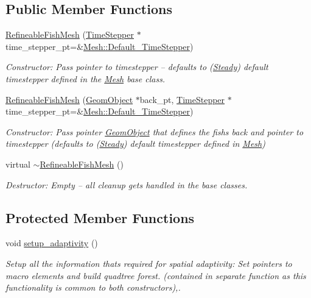 \subsection*{Public Member Functions}
\begin{DoxyCompactItemize}
\item 
\hyperlink{classoomph_1_1RefineableFishMesh_a7f31e65306286e83a5d17459bae9163d}{Refineable\+Fish\+Mesh} (\hyperlink{classoomph_1_1TimeStepper}{Time\+Stepper} $\ast$time\+\_\+stepper\+\_\+pt=\&\hyperlink{classoomph_1_1Mesh_a12243d0fee2b1fcee729ee5a4777ea10}{Mesh\+::\+Default\+\_\+\+Time\+Stepper})
\begin{DoxyCompactList}\small\item\em Constructor\+: Pass pointer to timestepper -- defaults to (\hyperlink{classoomph_1_1Steady}{Steady}) default timestepper defined in the \hyperlink{classoomph_1_1Mesh}{Mesh} base class. \end{DoxyCompactList}\item 
\hyperlink{classoomph_1_1RefineableFishMesh_a82bc04aea6deaf2faa7306aa047e12ef}{Refineable\+Fish\+Mesh} (\hyperlink{classoomph_1_1GeomObject}{Geom\+Object} $\ast$back\+\_\+pt, \hyperlink{classoomph_1_1TimeStepper}{Time\+Stepper} $\ast$time\+\_\+stepper\+\_\+pt=\&\hyperlink{classoomph_1_1Mesh_a12243d0fee2b1fcee729ee5a4777ea10}{Mesh\+::\+Default\+\_\+\+Time\+Stepper})
\begin{DoxyCompactList}\small\item\em Constructor\+: Pass pointer \hyperlink{classoomph_1_1GeomObject}{Geom\+Object} that defines the fish\textquotesingle{}s back and pointer to timestepper (defaults to (\hyperlink{classoomph_1_1Steady}{Steady}) default timestepper defined in \hyperlink{classoomph_1_1Mesh}{Mesh}) \end{DoxyCompactList}\item 
virtual \hyperlink{classoomph_1_1RefineableFishMesh_a8304d093e015001a6d56faebdd2d4636}{$\sim$\+Refineable\+Fish\+Mesh} ()
\begin{DoxyCompactList}\small\item\em Destructor\+: Empty -- all cleanup gets handled in the base classes. \end{DoxyCompactList}\end{DoxyCompactItemize}
\subsection*{Protected Member Functions}
\begin{DoxyCompactItemize}
\item 
void \hyperlink{classoomph_1_1RefineableFishMesh_a1fb10f94f78c7a4e37113fbf4c72f00c}{setup\+\_\+adaptivity} ()
\begin{DoxyCompactList}\small\item\em Setup all the information that\textquotesingle{}s required for spatial adaptivity\+: Set pointers to macro elements and build quadtree forest. (contained in separate function as this functionality is common to both constructors),. \end{DoxyCompactList}\end{DoxyCompactItemize}
